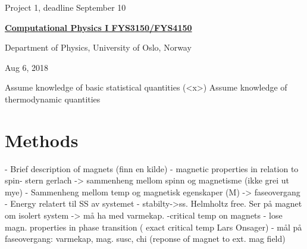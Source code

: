 \documentclass[%
oneside,                 %
final,                   %
10pt]{article}
\begin{document}

\newcommand{\exercisesection}[1]{\subsection*{#1}}






\thispagestyle{empty}

\begin{center}
{\LARGE\bf
\begin{spacing}{1.25}
Project 1, deadline  September 10
\end{spacing}
}
\end{center}


\begin{center}
{\bf \href{{http://www.uio.no/studier/emner/matnat/fys/FYS3150/index-eng.html}}{Computational Physics I FYS3150/FYS4150}}
\end{center}

    \begin{center}
\centerline{{\small Department of Physics, University of Oslo, Norway}}
\end{center}
    

\begin{center}
Aug 6, 2018
\end{center}

\vspace{1cm}


Assume knowledge of basic statistical quantities (<x>)
Assume knowledge of thermodynamic quantities 

\section{Methods}
- Brief description of magnets (finn en kilde)
	- magnetic properties in relation to spin- stern gerlach -> sammenheng mellom spinn og magnetisme (ikke grei ut mye)
	- Sammenheng mellom temp og magnetisk egenskaper (M) -> faseovergang
	- Energy relatert til SS av systemet - stabilty->ss. Helmholtz free. Ser på magnet om isolert system -> må ha med varmekap.
	-critical temp on magnets - lose magn. properties in phase 	 		transition ( exact critical temp Lars Onsager)
	- mål på faseovergang: varmekap, mag. susc, chi (reponse of magnet to ext. mag field) 
	
\end{document}
